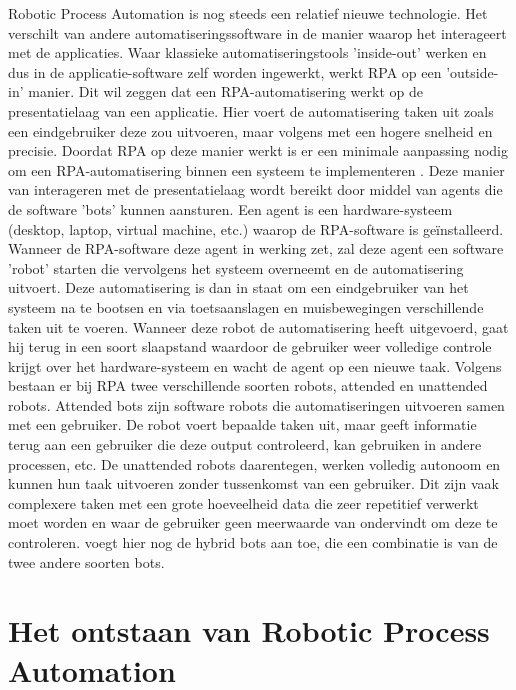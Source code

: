 Robotic Process Automation is nog steeds een relatief nieuwe technologie. Het verschilt van andere automatiseringssoftware in de manier waarop het interageert met de applicaties. Waar klassieke automatiseringstools 'inside-out' werken en dus in de applicatie-software zelf worden ingewerkt, werkt RPA op een 'outside-in' manier. Dit wil zeggen dat een RPA-automatisering werkt op de presentatielaag van een applicatie. 
Hier voert de automatisering taken uit zoals een eindgebruiker deze zou uitvoeren, maar volgens \textcite{Bras2023} met een hogere snelheid en precisie. Doordat RPA op deze manier werkt is er een minimale aanpassing nodig om een RPA-automatisering binnen een systeem te implementeren \autocite{Ivancic2019}.
Deze manier van interageren met de presentatielaag wordt bereikt door middel van agents die de software 'bots' kunnen aansturen. Een agent is een hardware-systeem (desktop, laptop, virtual machine, etc.) waarop de RPA-software is geïnstalleerd. Wanneer de RPA-software deze agent in werking zet, zal deze agent een software 'robot' starten die vervolgens het systeem overneemt en de automatisering uitvoert. 
Deze automatisering is dan in staat om een eindgebruiker van het systeem na te bootsen en via toetsaanslagen en muisbewegingen verschillende taken uit te voeren. Wanneer deze robot de automatisering heeft uitgevoerd, gaat hij terug in een soort slaapstand waardoor de gebruiker weer volledige controle krijgt over het hardware-systeem en wacht de agent op een nieuwe taak.
Volgens \textcite{Ivancic2019} bestaan er bij RPA twee verschillende soorten robots, attended en unattended robots. Attended bots zijn software robots die automatiseringen uitvoeren samen met een gebruiker. De robot voert bepaalde taken uit, maar geeft informatie terug aan een gebruiker die deze output controleerd, kan gebruiken in andere processen, etc. De unattended robots daarentegen, werken volledig autonoom en kunnen hun taak uitvoeren zonder tussenkomst van een gebruiker. 
Dit zijn vaak complexere taken met een grote hoeveelheid data die zeer repetitief verwerkt moet worden en waar de gebruiker geen meerwaarde van ondervindt om deze te controleren. \textcite{Axmann2022} voegt hier nog de hybrid bots aan toe, die een combinatie is van de twee andere soorten bots.

\section{Het ontstaan van Robotic Process Automation}
\label{sec:ontstaan-van-rpa}

